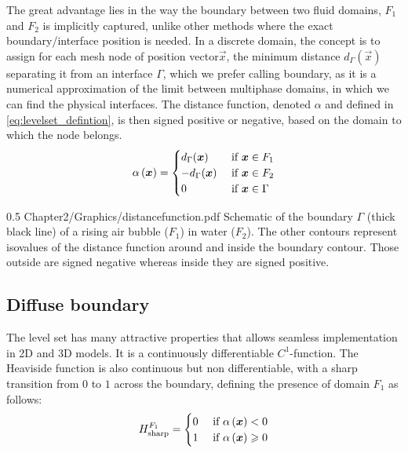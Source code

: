 The great advantage lies in the way the boundary between two fluid domains, $F_1$ and $F_2$ is implicitly captured, unlike 
other methods where the exact boundary/interface position is needed. In a discrete domain, the concept is to assign for each 
mesh node of position vector$\vec{x}$, the minimum distance $d_\Gamma(\vec{x})$ separating it from an interface $\Gamma$,
which we prefer calling boundary, as it is a numerical approximation of the limit between multiphase domains, in which we can find the physical interfaces.
The distance function, denoted $\alpha$ and defined in \cref{eq:levelset_defintion}, is then signed positive or negative, based on the domain 
to which the node belongs.
\begin{align}
\label{eq:levelset_defintion}
\levelsetx = 
\begin{cases}
  d_\Gamma(\vec{x}) 		& \text{ if } \vec{x} \in F_1 \\ 
 -d_\Gamma(\vec{x})			& \text{ if } \vec{x} \in F_2 \\ 
  0 						& \text{ if } \vec{x} \in \Gamma %
\end{cases}
\end{align}
\begin{figureth}
{0.5}
{Chapter2/Graphics/distancefunction.pdf}
{Schematic of the boundary $\Gamma$ (thick black line) of a rising air bubble ($F_1$) in water ($F_2$). 
The other contours represent isovalues of the distance function around and inside the boundary contour. 
Those outside are signed negative whereas inside they are signed positive.}
\label{fig:distance_function}
\end{figureth}

\subsection{Diffuse boundary} \label{sec:heaviside}

The level set has many attractive properties that allows seamless implementation in 2D and 3D models. 
It is a continuously differentiable $C^1$-function. 
The Heaviside function is also continuous but non differentiable, with a sharp transition from $0$ to $1$ 
across the boundary, defining the presence of domain $F_1$ as follows:
\begin{align}
\label{eq:no_smoothing}
H_\text{sharp}^{F_1}= 
\begin{cases}
	0  & \text{ if } \alpha \left( \boldsymbol{x} \right) < 0 \\
    1  & \text{ if } \alpha \left( \boldsymbol{x} \right) \geqslant 0 \\  
\end{cases}
\end{align}

